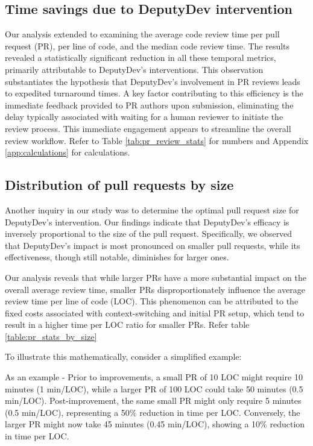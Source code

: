 \subsection{Time savings due to DeputyDev intervention}
Our analysis extended to examining the average code review time per pull request (PR), per line of code, and the median code review time. The results revealed a statistically significant reduction in all these temporal metrics, primarily attributable to DeputyDev's interventions. This observation substantiates the hypothesis that DeputyDev's involvement in PR reviews leads to expedited turnaround times. A key factor contributing to this efficiency is the immediate feedback provided to PR authors upon submission, eliminating the delay typically associated with waiting for a human reviewer to initiate the review process. This immediate engagement appears to streamline the overall review workflow. Refer to Table \ref{tab:pr_review_stats} for numbers and Appendix \ref{app:calculations} for calculations.






\subsection{Distribution of pull requests by size}
Another inquiry in our study was to determine the optimal pull request size for DeputyDev's intervention. Our findings indicate that DeputyDev's efficacy is inversely proportional to the size of the pull request. Specifically, we observed that DeputyDev's impact is most pronounced on smaller pull requests, while its effectiveness, though still notable, diminishes for larger ones.

Our analysis reveals that while larger PRs have a more substantial impact on the overall average review time, smaller PRs disproportionately influence the average review time per line of code (LOC). This phenomenon can be attributed to the fixed costs associated with context-switching and initial PR setup, which tend to result in a higher time per LOC ratio for smaller PRs. Refer table \ref{table:pr_stats_by_size}

To illustrate this mathematically, consider a simplified example:

As an example - Prior to improvements, a small PR of 10 LOC might require 10 minutes (1 min/LOC), while a larger PR of 100 LOC could take 50 minutes (0.5 min/LOC). Post-improvement, the same small PR might only require 5 minutes (0.5 min/LOC), representing a 50\% reduction in time per LOC. Conversely, the larger PR might now take 45 minutes (0.45 min/LOC), showing a 10\% reduction in time per LOC.

